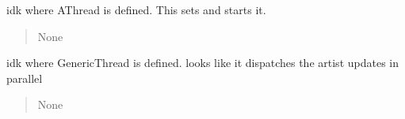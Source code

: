 \documentclass[letterpaper,10pt,english]{sphinxmanual}
\begin{document}
\begin{fulllineitems}
\begin{fulllineitems}
\begin{quote}
\begin{description}
\end{description}\end{quote}

\end{fulllineitems}


\begin{fulllineitems}
\label{\detokenize{api/killMS.Plot:killMS.Plot.Graph.ClassMplWidget.updateThread}}
\pysigstartsignatures
{}
\pysigstopsignatures
\sphinxAtStartPar
idk where AThread is defined. This sets and starts it.
\begin{quote}\begin{description}
\sphinxAtStartPar
None

\end{description}\end{quote}

\end{fulllineitems}


\begin{fulllineitems}
\label{\detokenize{api/killMS.Plot:killMS.Plot.Graph.ClassMplWidget.updateThread2}}
\pysigstartsignatures
{}
\pysigstopsignatures
\sphinxAtStartPar
idk where GenericThread is defined.
looks like it dispatches the artist updates in parallel
\begin{quote}\begin{description}
\sphinxAtStartPar
None

\end{description}\end{quote}

\end{fulllineitems}


\end{fulllineitems}

\end{document}
